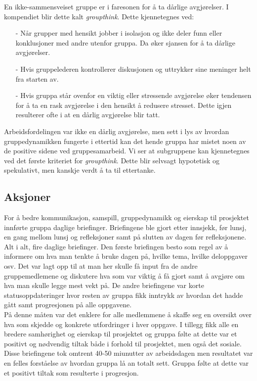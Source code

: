 En ikke-sammensveiset gruppe er i faresonen for å ta dårlige avgjørelser. I kompendiet blir dette kalt \textit{groupthink}. Dette kjennetegnes ved\cite{EffectiveTeams}:
\begin{itemize}
    \item [-] Når grupper med hensikt jobber i isolasjon og ikke deler funn eller konklusjoner med andre utenfor gruppa. Da øker sjansen for å ta dårlige avgjørelser.
    \item [-] Hvis gruppelederen kontrollerer diskusjonen og uttrykker sine meninger helt fra starten av.
    \item [-] Hvis gruppa står ovenfor en viktig eller stressende avgjørelse øker tendensen for å ta en rask avgjørelse i den hensikt å redusere stresset. Dette igjen resulterer ofte i at en dårlig avgjørelse blir tatt.
\end{itemize}

Arbeidsfordelingen var ikke en dårlig avgjørelse, men sett i lys av hvordan gruppedynamikken fungerte i ettertid kan det hende gruppa har mistet noen av de positive sidene ved gruppesamarbeid. Vi ser at subgruppene kan kjennetegnes ved det første kriteriet for \textit{groupthink}. Dette blir selvsagt hypotetisk og spekulativt, men kanskje verdt å ta til ettertanke.
\newpage

\subsection{Aksjoner}
For å bedre kommunikasjon, samspill, gruppedynamikk og eierskap til prosjektet innførte gruppa daglige briefinger. Briefingene ble gjort etter innsjekk, før lunsj, en gang mellom lunsj og refleksjoner samt på slutten av dagen før refleksjonene. Alt i alt, fire daglige briefinger. Den første briefingen besto som regel av å informere om hva man tenkte å bruke dagen på, hvilke tema, hvilke deloppgaver osv. Det var lagt opp til at man her skulle få input fra de andre gruppemedlemene og diskutere hva som var viktig å få gjort samt å avgjøre om hva man skulle legge mest vekt på. De andre briefingene var korte statusoppdateringer hvor resten av gruppa fikk inntrykk av hvordan det hadde gått samt progresjonen på alle oppgavene.\\

På denne måten var det enklere for alle medlemmene å skaffe seg en oversikt over hva som skjedde og konkrete utfordringer i hver oppgave. I tillegg fikk alle en bredere samhørighet og eierskap til prosjektet og gruppa følte at dette var et positivt og nødvendig tiltak både i forhold til prosjektet, men også det sosiale. Disse briefingene tok omtrent 40-50 miunutter av arbeidsdagen men resultatet var en felles forståelse av hvordan gruppa lå an totalt sett. Gruppa følte at dette var et positivt tiltak som resulterte i progresjon.\\

